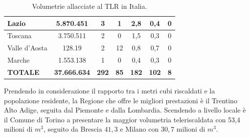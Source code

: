 \documentclass[laurea,oneside,11pt]{USiena_tesiLM}
\begin{document}
\begin{table}[!ht]
{\begin{tabular}{|l|c|c|c|c|c|c|}
Lazio                             & 5.870.451                                           & 3                                & 1                                     & 2,8                                        & 0,4                                     & 0                                         \\ \hline
Toscana                           & 3.750.511                                           & 2                                & 0                                     & 1,5                                        & 0,3                                     & 0                                         \\ \hline
Valle d'Aosta                     & 128.19                                              & 2                                & 12                                    & 0,8                                        & 0,7                                     & 0                                         \\ \hline
Marche                            & 1.553.138                                           & 1                                & 0                                     & 0,4                                        & 0,3                                     & 0                                         \\ \hline
\textbf{TOTALE}                   & \textbf{37.666.634}                                 & \textbf{292}                     & \textbf{85}                           & \textbf{182}                               & \textbf{102}                            & \textbf{8}                                \\ \hline
\end{tabular}}
\caption{Volumetrie allacciate al TLR in Italia.}
\label{tab:volumetrie_teleriscaldamento}
\end{table}

Prendendo in considerazione il rapporto tra i metri cubi riscaldati e la popolazione
residente, la Regione che offre le migliori prestazioni è il Trentino Alto Adige, seguita dal Piemonte e dalla Lombardia. 
Scendendo a livello locale è il Comune di Torino a presentare la maggior volumetria teleriscaldata con 53,4 milioni di $m^3$, seguito da Brescia $41,3$ e Milano con $30,7$ milioni di $m^3$.\\
\end{document}
